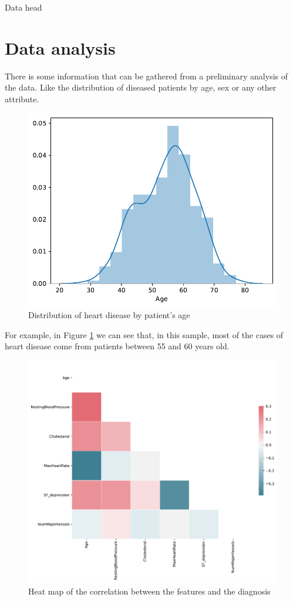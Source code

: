 \documentclass[conference]{IEEEtran}
\begin{document}
\begin{table}[htbp]
    \caption{Data head}
    \begin{center}
        \resizebox{\columnwidth}{!}{%
            
        }%
        \label{data_head}
    \end{center}
\end{table}

\section{Data analysis}

There is some information that can be gathered from a preliminary analysis of the data. Like the distribution of diseased patients by age, sex or any other attribute.

\begin{figure}[htbp]
    \centerline{\includegraphics[width=0.7\linewidth]{images/age_distribution.pdf}}
    \caption{Distribution of heart disease by patient's age}
    \label{age_dist}
\end{figure}

For example, in Figure \ref{age_dist} we can see that, in this sample, most of the cases of heart disease come from patients between 55 and 60 years old.

\begin{figure}[H]
    \centerline{\includegraphics[width=0.7\linewidth]{images/correlation_heatmap.pdf}}
    \caption{Heat map of the correlation between the features and the diagnosis}
    \label{corr_heatmap}
\end{figure}
\end{document}
